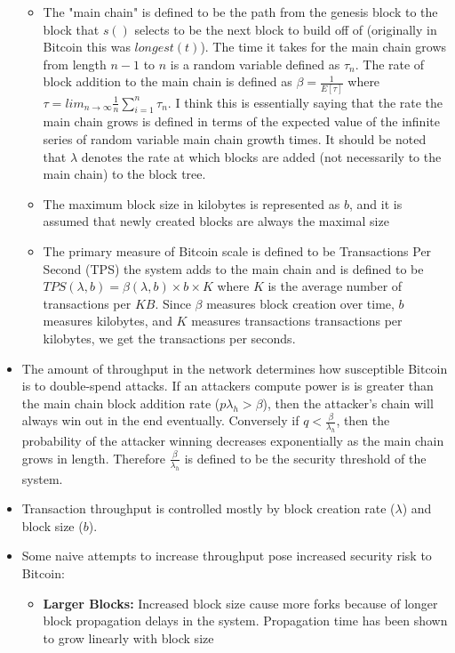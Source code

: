 \documentclass[a4paper]{article}
\begin{document}
\begin{itemize}
\begin{itemize}
\item The "main chain" is defined to be the path from the genesis block to the block that $s()$ selects to be the next block to build off of (originally in Bitcoin this was $longest(t)$). The time it takes for the main chain grows from length $n-1$ to $n$ is a random variable defined as $\tau_n$. The rate of block addition to the main chain is defined as $\beta = \frac{1}{E[\tau]}$ where $\tau = lim_{n\rightarrow\infty}\frac{1}{n}\sum_{i=1}^n\tau_n$. I think this is essentially saying that the rate the main chain grows is defined in terms of the expected value of the infinite series of random variable main chain growth times. It should be noted that $\lambda$ denotes the rate at which blocks are added (not necessarily to the main chain) to the block tree.

\item The maximum block size in kilobytes is represented as $b$, and it is assumed that newly created blocks are always the maximal size

\item The primary measure of Bitcoin scale is defined to be Transactions Per Second (TPS) the system adds to the main chain and is defined to be $TPS(\lambda, b) = \beta(\lambda, b) \times b \times K$ where $K$ is the average number of transactions per $KB$. Since $\beta$ measures block creation over time, $b$ measures kilobytes, and $K$ measures transactions transactions per kilobytes, we get the transactions per seconds.
\end{itemize}

\item The amount of throughput in the network determines how susceptible Bitcoin is to double-spend attacks. If an attackers compute power is is greater than the main chain block addition rate ($p\lambda_h > \beta$), then the attacker's chain will always win out in the end eventually. Conversely if $q < \frac{\beta}{\lambda_h}$, then the probability of the attacker winning decreases exponentially as the main chain grows in length. Therefore $\frac{\beta}{\lambda_h}$ is defined to be the security threshold of the system.

\item Transaction throughput is controlled mostly by block creation rate ($\lambda$) and block size ($b$).

\item Some naive attempts to increase throughput pose increased security risk to Bitcoin:
\begin{itemize}
\item \textbf{Larger Blocks:} Increased block size cause more forks because of longer block propagation delays in the system. Propagation time has been shown to grow linearly with block size


\end{itemize}
\end{itemize}
\end{document}
